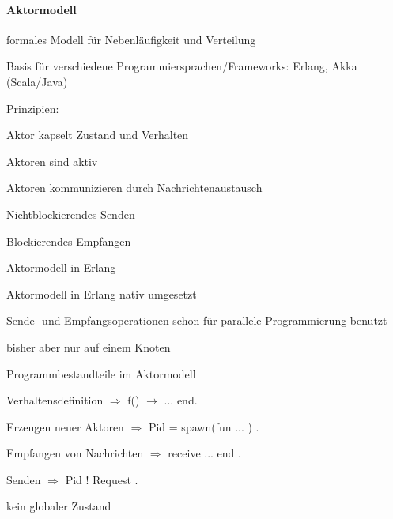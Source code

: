\documentclass[10pt]{article}
\begin{document}
\begin{itemize*}
\paragraph{Aktormodell}
\begin{itemize*}
  \item formales Modell für Nebenläufigkeit und Verteilung
  \item Basis für verschiedene Programmiersprachen/Frameworks: Erlang, Akka (Scala/Java)
  \item Prinzipien:
  \begin{itemize*}
    \item Aktor kapselt Zustand und Verhalten
    \item Aktoren sind aktiv
    \item Aktoren kommunizieren durch Nachrichtenaustausch
    \begin{itemize*}
      \item Nichtblockierendes Senden
      \item Blockierendes Empfangen
    \end{itemize*}
  \end{itemize*}
\end{itemize*}

Aktormodell in Erlang
\begin{itemize*}
  \item Aktormodell in Erlang nativ umgesetzt
  \begin{itemize*}
    \item Sende- und Empfangsoperationen schon für parallele Programmierung benutzt
    \item bisher aber nur auf einem Knoten
  \end{itemize*}
  \item Programmbestandteile im Aktormodell
  \begin{itemize*}
    \item Verhaltensdefinition $\Rightarrow$ f() $\rightarrow$ ... end.
    \item Erzeugen neuer Aktoren $\Rightarrow$ Pid = spawn(fun ... ) .
    \item Empfangen von Nachrichten $\Rightarrow$ receive ... end .
    \item Senden $\Rightarrow$ Pid ! Request .
  \end{itemize*}
  \item kein globaler Zustand
\end{itemize*}


\end{itemize*}
\end{document}
